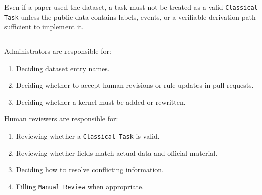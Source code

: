\begin{tcolorbox}
\smallskip{}\par\smallskip

\noindent Even if a paper used the dataset, a task must not be treated as a valid \texttt{Classical Task} unless the public data contains labels, events, or a verifiable derivation path sufficient to implement it.\par\smallskip

\medskip{}
\par\nopagebreak\noindent\rule{\linewidth}{0.4pt}\par\smallskip

\smallskip{}\par\smallskip

\noindent Administrators are responsible for:\par\smallskip

\begin{enumerate}[leftmargin=1.5em,noitemsep,topsep=2pt]
\item Deciding dataset entry names.
\item Deciding whether to accept human revisions or rule updates in pull requests.
\item Deciding whether a kernel must be added or rewritten.
\end{enumerate}

\smallskip{}\par\smallskip

\noindent Human reviewers are responsible for:\par\smallskip

\begin{enumerate}[leftmargin=1.5em,noitemsep,topsep=2pt]
\item Reviewing whether a \texttt{Classical Task} is valid.
\item Reviewing whether fields match actual data and official material.
\item Deciding how to resolve conflicting information.
\item Filling \texttt{Manual Review} when appropriate.
\end{enumerate}

\smallskip{}\par\smallskip


\end{tcolorbox}

